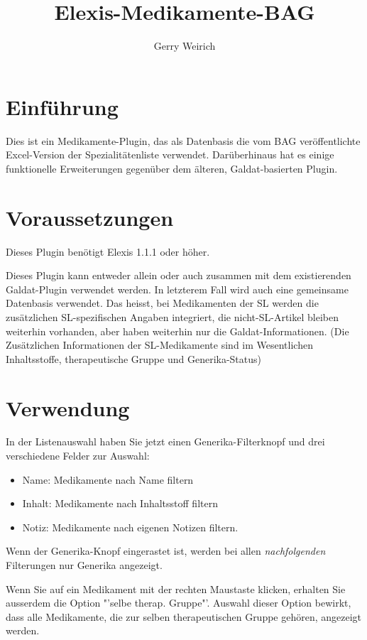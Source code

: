 \documentclass[a4paper]{scrartcl}
\title{Elexis-Medikamente-BAG}
\author{Gerry Weirich}
\begin{document}
\maketitle
\section{Einführung}

Dies ist ein Medikamente-Plugin, das als Datenbasis die vom BAG veröffentlichte Excel\texttrademark-Version der Spezialitätenliste verwendet. Darüberhinaus hat es einige funktionelle Erweiterungen gegenüber dem älteren, Galdat-basierten Plugin.

\section{Voraussetzungen}
Dieses Plugin benötigt Elexis 1.1.1 oder höher.

\medskip

Dieses Plugin kann entweder allein oder auch zusammen mit dem existierenden Galdat-Plugin verwendet werden. In letzterem Fall wird auch eine gemeinsame Datenbasis verwendet. Das heisst, bei Medikamenten der SL werden die zusätzlichen SL-spezifischen Angaben integriert, die nicht-SL-Artikel bleiben weiterhin vorhanden, aber haben weiterhin nur die Galdat-Informationen. (Die Zusätzlichen Informationen der SL-Medikamente sind im Wesentlichen Inhaltsstoffe, therapeutische Gruppe und Generika-Status)

\section{Verwendung}


In der Listenauswahl haben Sie jetzt einen Generika-Filterknopf und drei verschiedene Felder zur Auswahl:
\begin{itemize}
    \item Name: Medikamente nach Name filtern
    \item Inhalt: Medikamente nach Inhaltsstoff filtern
    \item Notiz: Medikamente nach eigenen Notizen filtern. 
\end{itemize}
Wenn der Generika-Knopf eingerastet ist, werden bei allen \textit{nachfolgenden} Filterungen nur Generika angezeigt.

\medskip

Wenn Sie auf ein Medikament mit der rechten Maustaste klicken, erhalten Sie ausserdem die Option "'selbe therap. Gruppe"'. Auswahl dieser Option bewirkt, dass alle Medikamente, die zur selben therapeutischen Gruppe gehören, angezeigt werden.
\end{document}
